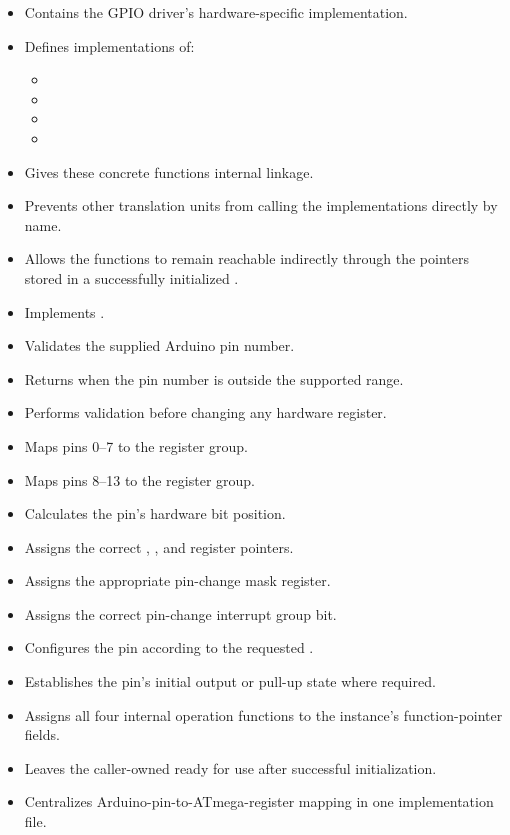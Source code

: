 \begin{itemize}
\begin{itemize}
    \item Contains the GPIO driver's hardware-specific implementation.
    \item Defines  implementations of:
    \begin{itemize}
      \item {}
      \item {}
      \item {}
      \item {}
    \end{itemize}
    \item Gives these concrete functions internal linkage.
    \item Prevents other translation units from calling the implementations directly by name.
    \item Allows the functions to remain reachable indirectly through the pointers stored in a
      successfully initialized .
    \item Implements .
    \item Validates the supplied Arduino pin number.
    \item Returns  when the pin number is outside the supported range.
    \item Performs validation before changing any hardware register.
    \item Maps pins 0--7 to the  register group.
    \item Maps pins 8--13 to the  register group.
    \item Calculates the pin's hardware bit position.
    \item Assigns the correct , , and  register pointers.
    \item Assigns the appropriate pin-change mask register.
    \item Assigns the correct pin-change interrupt group bit.
    \item Configures the pin according to the requested .
    \item Establishes the pin's initial output or pull-up state where required.
    \item Assigns all four internal operation functions to the instance's function-pointer fields.
    \item Leaves the caller-owned  ready for use after successful initialization.
    \item Centralizes Arduino-pin-to-ATmega-register mapping in one implementation file.

\end{itemize}
\end{itemize}
